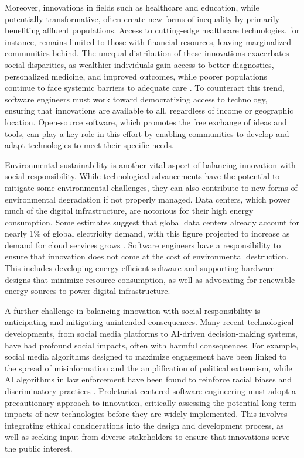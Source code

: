 \begin{refsection}
Moreover, innovations in fields such as healthcare and education, while potentially transformative, often create new forms of inequality by primarily benefiting affluent populations. Access to cutting-edge healthcare technologies, for instance, remains limited to those with financial resources, leaving marginalized communities behind. The unequal distribution of these innovations exacerbates social disparities, as wealthier individuals gain access to better diagnostics, personalized medicine, and improved outcomes, while poorer populations continue to face systemic barriers to adequate care \cite[pp.~204-206]{dean2018}. To counteract this trend, software engineers must work toward democratizing access to technology, ensuring that innovations are available to all, regardless of income or geographic location. Open-source software, which promotes the free exchange of ideas and tools, can play a key role in this effort by enabling communities to develop and adapt technologies to meet their specific needs.

Environmental sustainability is another vital aspect of balancing innovation with social responsibility. While technological advancements have the potential to mitigate some environmental challenges, they can also contribute to new forms of environmental degradation if not properly managed. Data centers, which power much of the digital infrastructure, are notorious for their high energy consumption. Some estimates suggest that global data centers already account for nearly 1\% of global electricity demand, with this figure projected to increase as demand for cloud services grows \cite[pp.~65-67]{hilty2014}. Software engineers have a responsibility to ensure that innovation does not come at the cost of environmental destruction. This includes developing energy-efficient software and supporting hardware designs that minimize resource consumption, as well as advocating for renewable energy sources to power digital infrastructure.

A further challenge in balancing innovation with social responsibility is anticipating and mitigating unintended consequences. Many recent technological developments, from social media platforms to AI-driven decision-making systems, have had profound social impacts, often with harmful consequences. For example, social media algorithms designed to maximize engagement have been linked to the spread of misinformation and the amplification of political extremism, while AI algorithms in law enforcement have been found to reinforce racial biases and discriminatory practices \cite[pp.~216-218]{zuboff2020}. Proletariat-centered software engineering must adopt a precautionary approach to innovation, critically assessing the potential long-term impacts of new technologies before they are widely implemented. This involves integrating ethical considerations into the design and development process, as well as seeking input from diverse stakeholders to ensure that innovations serve the public interest.


\end{refsection}
